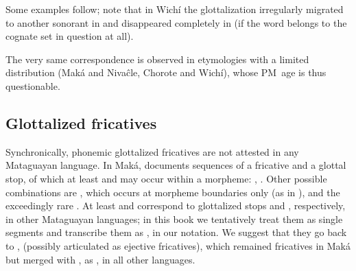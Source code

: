 Some examples follow; note that in Wichí the glottalization irregularly migrated to another sonorant in  and disappeared completely in  (if the word belongs to the cognate set in question at all).

\begin{exe}
    \ex \flyv
    \ex \coldweather
    \ex \jaguar
    \ex \treen
    \ex \nightmonkey
    \ex \languageword
    \ex {}
    \ex \zorzal
    \ex \smellv
    \ex \demnn
    \ex \dayworld
    \ex \pathn
    \ex \hear
    \ex \likelove
    \ex \healthy
    \ex \rhea \label{'w-rhea}
    \ex \walk
    \ex \seev
    \ex \placen
    \ex \rib
    \ex \neck
    \ex \blood
    \ex \butterfly
    \ex \climb
    \ex \vrbpl
    \ex \argentineboa \label{'w-argentineboa}
\end{exe}

The very same correspondence is observed in etymologies with a limited distribution (Maká and Nivaĉle, Chorote and Wichí), whose PM~age is thus questionable.

\begin{exe}
    \ex \lizard
    \ex \heartmn
    \ex \frog
    \ex \stagnant
    \ex \onemn
    \ex \leafhaircw
    \ex \clothes
\end{exe}

\subsection{Glottalized fricatives}\label{glott-fric}
Synchronically, phonemic glottalized fricatives are not attested in any Mataguayan language. In Maká, \citet[46, 67--68]{AG94} documents sequences of a fricative and a glottal stop, of which at least  and  may occur within a morpheme: , . Other possible combinations are , which occurs at morpheme boundaries only (as in ), and the exceedingly rare . At least  and  correspond to glottalized stops  and , respectively, in other Mataguayan languages; in this book we tentatively treat them as single segments and transcribe them as ,  in our notation. We suggest that they go back to ,  (possibly articulated as ejective fricatives), which remained fricatives in Maká but merged with ,  as ,  in all other languages.

\begin{exe}
    \ex \poor
    \ex \foot
    \ex \arrowfok
    \ex \samsam
\end{exe}

